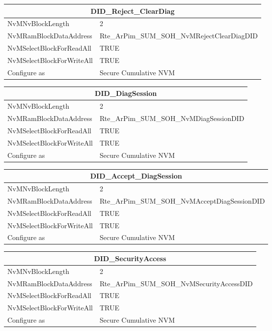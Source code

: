 \begin{tabular}{|l|p{8cm}|}\hline
\multicolumn{2}{|c|}{\textbf{DID\_Reject\_ClearDiag}}\\\hline
NvMNvBlockLength&2\\\hline
NvMRamBlockDataAddress&Rte\_ArPim\_SUM\_SOH\_NvMRejectClearDiagDID\\\hline
NvMSelectBlockForReadAll&TRUE\\\hline
NvMSelectBlockForWriteAll&TRUE\\\hline
Configure as&Secure Cumulative NVM\\\hline
\end{tabular}

\begin{tabular}{|l|p{8cm}|}\hline
\multicolumn{2}{|c|}{\textbf{DID\_DiagSession}}\\\hline
NvMNvBlockLength&2\\\hline
NvMRamBlockDataAddress&Rte\_ArPim\_SUM\_SOH\_NvMDiagSessionDID\\\hline
NvMSelectBlockForReadAll&TRUE\\\hline
NvMSelectBlockForWriteAll&TRUE\\\hline
Configure as&Secure Cumulative NVM\\\hline
\end{tabular}

\begin{tabular}{|l|p{8cm}|}\hline
\multicolumn{2}{|c|}{\textbf{DID\_Accept\_DiagSession}}\\\hline
NvMNvBlockLength&2\\\hline
NvMRamBlockDataAddress&Rte\_ArPim\_SUM\_SOH\_NvMAcceptDiagSessionDID\\\hline
NvMSelectBlockForReadAll&TRUE\\\hline
NvMSelectBlockForWriteAll&TRUE\\\hline
Configure as&Secure Cumulative NVM\\\hline
\end{tabular}

\begin{tabular}{|l|p{8cm}|}\hline
\multicolumn{2}{|c|}{\textbf{DID\_SecurityAccess}}\\\hline
NvMNvBlockLength&2\\\hline
NvMRamBlockDataAddress&Rte\_ArPim\_SUM\_SOH\_NvMSecurityAccessDID\\\hline
NvMSelectBlockForReadAll&TRUE\\\hline
NvMSelectBlockForWriteAll&TRUE\\\hline
Configure as&Secure Cumulative NVM\\\hline
\end{tabular}


